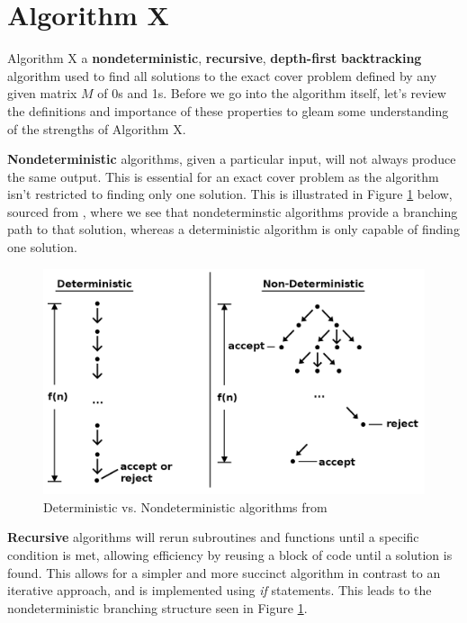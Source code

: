 \documentclass{article}
\begin{document}
\clearpage
\section{Algorithm X}
Algorithm X a \textbf{nondeterministic}, \textbf{recursive}, \textbf{depth-first} \textbf{backtracking} algorithm used to find all solutions to the exact cover problem defined by any given matrix $M$ of 0s and 1s. Before we go into the algorithm itself, let's review the definitions and importance of these properties to gleam some understanding of the strengths of Algorithm X.

\textbf{Nondeterministic} algorithms, given a particular input, will not always produce the same output. This is essential for an exact cover problem as the algorithm isn't restricted to finding only one solution. This is illustrated in Figure \ref{fig: Deterministic vs. nondeterministic algorithms} below, sourced from  \cite{nondeterministicfig}, where we see that nondeterminstic algorithms provide a branching path to that solution, whereas a deterministic algorithm is only capable of finding one solution.
\begin{figure}[ht]
\includegraphics[scale=0.3]{images/NonDeterministic.png}
\caption{Deterministic vs. Nondeterministic algorithms from \cite{nondeterministicfig}}
\label{fig: Deterministic vs. nondeterministic algorithms}
\end{figure}

\textbf{Recursive} algorithms will rerun subroutines and functions until a specific condition is met, allowing efficiency by reusing a block of code until a solution is found. This allows for a simpler and more succinct algorithm in contrast to an iterative approach, and is implemented using \textit{if} statements. This leads to the nondeterministic branching structure seen in Figure \ref{fig: Deterministic vs. nondeterministic algorithms}.
\end{document}
